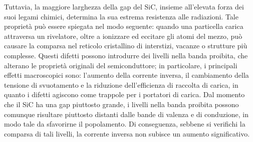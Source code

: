 %

%
Tuttavia, la maggiore larghezza della gap del SiC, insieme all'elevata forza dei suoi legami chimici, determina la sua estrema resistenza alle radiazioni.
Tale proprietà può essere spiegata nel modo seguente: quando una particella carica attraversa un rivelatore, oltre a ionizzare ed eccitare gli atomi del mezzo, può causare la comparsa nel reticolo cristallino di interstizi, vacanze o strutture più complesse.
Questi difetti possono introdurre dei livelli nella banda proibita, che alterano le proprietà originali del semiconduttore; in particolare, i principali effetti macroscopici sono: l'aumento della corrente inversa, il cambiamento della tensione di svuotamento e la riduzione dell'efficienza di raccolta di carica, in quanto i difetti agiscono come trappole per i portatori di carica.
Dal momento che il SiC ha una gap piuttosto grande, i livelli nella banda proibita possono comunque risultare piuttosto distanti dalle bande di valenza e di conduzione, in modo tale da sfavorirne il popolamento.
Di conseguenza, sebbene si verifichi la comparsa di tali livelli, la corrente inversa non subisce un aumento significativo.

